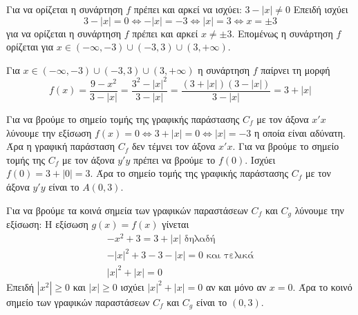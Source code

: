 
\begin{alist}
\item Για να ορίζεται η συνάρτηση $f$ πρέπει και αρκεί να ισχύει: $3 - |x| \ne 0$
Επειδή ισχύει
\[3 - |x| = 0 \Leftrightarrow -|x| = -3 \Leftrightarrow |x| = 3 \Leftrightarrow x = \pm 3\]
για να ορίζεται η συνάρτηση $f$ πρέπει και αρκεί $x \ne \pm 3$.
Επομένως η συνάρτηση $f$ ορίζεται για $x \in (-\infty, -3) \cup (-3, 3) \cup (3, +\infty)$.

\item Για $x \in (-\infty, -3) \cup (-3, 3) \cup (3, +\infty)$ η συνάρτηση $f$ παίρνει τη μορφή
\[f(x) = \dfrac{9 - x^2}{3 - |x|} = \dfrac{3^2 - |x|^2}{3 - |x|} = \dfrac{(3 + |x|)(3 - |x|)}{3 - |x|} = 3 + |x|\]

\item Για να βρούμε το σημείο τομής της γραφικής παράστασης $C_f$ με τον άξονα $x'x$ λύνουμε την εξίσωση $f(x) = 0 \Leftrightarrow 3 + |x| = 0 \Leftrightarrow |x| = -3$ η οποία είναι αδύνατη. Άρα η γραφική παράσταση $C_f$ δεν τέμνει τον άξονα $x'x$.
Για να βρούμε το σημείο τομής της $C_f$ με τον άξονα $y'y$ πρέπει να βρούμε το $f(0)$.
Ισχύει $f(0) = 3 + |0| = 3$. Άρα το σημείο τομής της γραφικής παράστασης $C_f$ με τον άξονα $y'y$ είναι το $A(0,3)$.

\item Για να βρούμε τα κοινά σημεία των γραφικών παραστάσεων $C_f$ και $C_g$ λύνουμε την εξίσωση:
Η εξίσωση $g(x) = f(x)$ γίνεται
\begin{gather*}
-x^2 + 3 = 3 + |x|\text{ δηλαδή} \\
-|x|^2 + 3 - 3 - |x| = 0\text{ και τελικά} \\
|x|^2 + |x| = 0
\end{gather*}
Επειδή $|x^2| \ge 0$ και $|x| \ge 0$ ισχύει $|x|^2 + |x| = 0$ αν και μόνο αν $x=0$.
Άρα το κοινό σημείο των γραφικών παραστάσεων $C_f$ και $C_g$ είναι το $(0, 3)$.
\end{alist}

